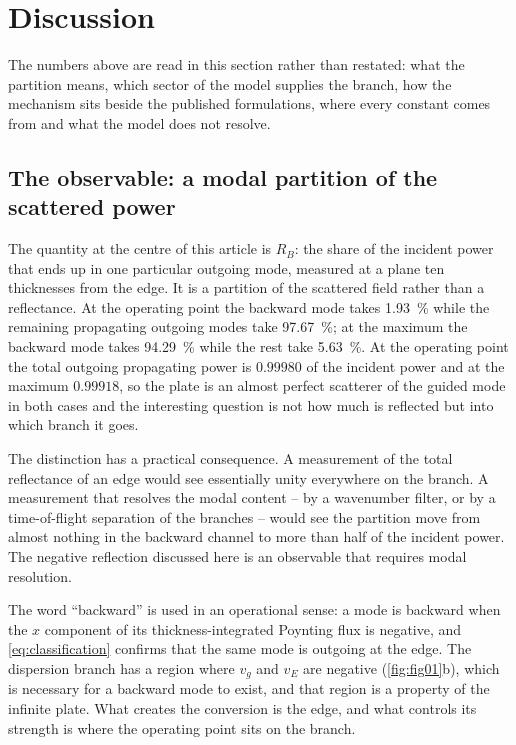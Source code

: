 \section{Discussion}
\label{sec:discussion}

The numbers above are read in this section rather than restated: what the
partition means, which sector of the model supplies the branch, how the
mechanism sits beside the published formulations, where every constant comes
from and what the model does not resolve.

\subsection{The observable: a modal partition of the scattered power}
\label{sec:disc_meaning}

The quantity at the centre of this article is $R_B$: the share of the incident
power that ends up in one particular outgoing mode, measured at a plane ten
thicknesses from the edge.  It is a partition of the scattered field rather than
a reflectance.  At the operating point the backward mode takes
\SI{1.93}{\percent} while the remaining propagating outgoing modes take
\SI{97.67}{\percent}; at the maximum the backward mode takes
\SI{94.29}{\percent} while the rest take \SI{5.63}{\percent}.  At the operating
point the total outgoing propagating power is $0.99980$ of the incident power
and at the maximum $0.99918$, so the plate is an almost perfect scatterer of the
guided mode in both cases and the interesting question is not how much is
reflected but into which branch it goes.

The distinction has a practical consequence.  A measurement of the total
reflectance of an edge would see essentially unity everywhere on the branch.  A
measurement that resolves the modal content -- by a wavenumber filter, or by a
time-of-flight separation of the branches -- would see the partition move from
almost nothing in the backward channel to more than half of the incident power.
The negative reflection discussed here is an observable that requires modal
resolution.

The word ``backward'' is used in an operational sense: a mode is backward when
the $x$ component of its thickness-integrated Poynting flux is negative, and
\eqref{eq:classification} confirms that the same mode is outgoing at the edge.
The dispersion branch has a region where $v_g$ and $v_E$ are negative
(\cref{fig:fig01}b), which is necessary for a backward mode to exist, and that
region is a property of the infinite plate.  What creates the conversion is the
edge, and what controls its strength is where the operating point sits on the
branch.

